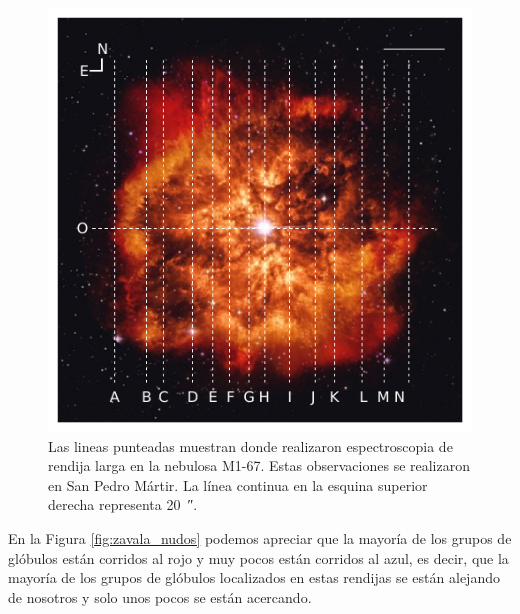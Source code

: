 \documentclass{book}
\begin{document}
\begin{figure}[htb]
    \centering
    \includegraphics[width=\textwidth]{Nuevas imagenes finales/rendijas_zavala.pdf}
    \caption{Las lineas punteadas muestran donde \cite{Zavala:2022}
      realizaron espectroscopia de rendija larga en la nebulosa M1-67.
      Estas observaciones se realizaron en San Pedro Mártir. La línea
      continua en la esquina superior derecha representa
      \SI{20}{\arcsecond}.}
    \label{fig:zavala_rendijas_nebula}
\end{figure}

En la Figura \ref{fig:zavala_nudos} podemos apreciar que la mayoría de
los grupos de glóbulos están corridos al rojo y muy pocos están
corridos al azul, es decir, que la mayoría de los grupos de glóbulos
localizados en estas rendijas se están alejando de nosotros y solo
unos pocos se están acercando.
\end{document}
